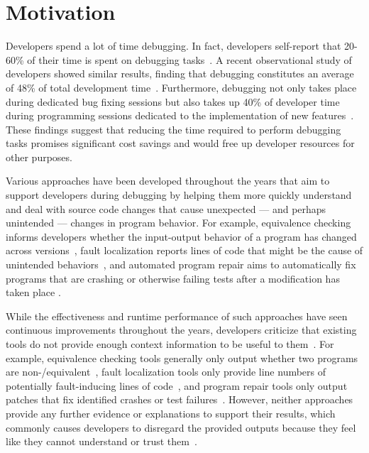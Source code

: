 \section{Motivation}

Developers spend a lot of time debugging.
%
In fact, developers self-report that 20-60\% of their time is spent on debugging tasks~\cite{beller_2018_dichotomy}.
%
A recent observational study of developers showed similar results, finding that debugging constitutes an average of 48\% of total development time~\cite{alaboudi_2021_debugging_episodes}.
%
Furthermore, debugging not only takes place during dedicated bug fixing sessions but also takes up 40\% of developer time during programming sessions dedicated to the implementation of new features~\cite{alaboudi_2021_debugging_episodes}.
%
These findings suggest that reducing the time required to perform debugging tasks promises significant cost savings and would free up developer resources for other purposes.


Various approaches have been developed throughout the years that aim to support developers during debugging by helping them more quickly understand and deal with source code changes that cause unexpected --- and perhaps unintended --- changes in program behavior.
%
For example, equivalence checking informs developers whether the input-output behavior of a program has changed across versions~\cite{person_2008_dse}, fault localization reports lines of code that might be the cause of unintended behaviors~\cite{wong_2016_survey}, and automated program repair aims to automatically fix programs that are crashing or otherwise failing tests after a modification has taken place \cite{legoues_2019_apr,monperrus_2018_bibliography}.


While the effectiveness and runtime performance of such approaches have seen continuous improvements throughout the years, developers criticize that existing tools do not provide enough context information to be useful to them~\cite{kochhar_2016_practitioners,parnin_2011_debugging_help}.
%
For example, equivalence checking tools generally only output whether two programs are non-/equivalent~\cite{badihi_2020_ardiff,jakobs_2021_peqcheck}, fault localization tools only provide line numbers of potentially fault-inducing lines of code~\cite{wong_2016_survey}, and program repair tools only output patches that fix identified crashes or test failures~\cite{mechtaev_2016_angelix,jifeng_2017_nopol}.
%
However, neither approaches provide any further evidence or explanations to support their results, which commonly causes developers to disregard the provided outputs because they feel like they cannot understand or trust them~\cite{noller_2022_trust_issues,parnin_2011_debugging_help,winter_2023_developers_feel}.

